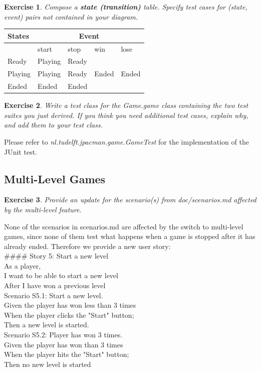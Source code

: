 \documentclass[a4paper]{article}
\newtheorem{thm}{Exercise}
\begin{document}
    \newpage
    \begin{thm}
      Compose a \textbf{state (transition)} table.
      Specify test cases for (state, event) pairs not contained in your diagram.
    \end{thm}
    \begin{table}[h]
      \begin{tabular}{|l|l|l|l|l|}
        \hline
        States  & \multicolumn{4}{|c|}{Event}        \\ \hline
                & start   & stop    & win    & lose  \\ \hline
        Ready   & Playing & Ready   &        &       \\ \hline
        Playing & Playing & Ready   & Ended  & Ended \\ \hline
        Ended   & Ended   & Ended   &        &       \\ \hline
      \end{tabular}
    \end{table}
    
    \begin{thm}
      Write a test class for the \textit{Game.game} class containing the two test suites you just derived.
      If you think you need additional test cases, explain why, and add them to your test class.
    \end{thm}
     Please refer to \textit{nl.tudelft.jpacman.game.GameTest} for the implementation of the JUnit test.
  
  \subsection{Multi-Level Games}
    \begin{thm}
      Provide an update for the scenario(s) from \textit{doc/scenarios.md} affected by the multi-level feature.
    \end{thm}
    None of the scenarios in scenarios.md are affected by the switch to multi-level games,
    since none of them test what happens when a game is stopped after it has already ended.
    Therefore we provide a new user story: \\[.2cm]
    \#\#\#\# Story 5: Start a new level \\[.4cm]
    As a player, \\
     I want to be able to start a new level \\
    After I have won a previous level \\[.4cm]
    Scenario S5.1: Start a new level. \\
    Given the player has won less than 3 times \\
    When  the player clicks the "Start" button; \\
    Then  a new level is started. \\[.4cm]
    Scenario S5.2: Player has won 3 times. \\
    Given the player has won than 3 times \\
    When  the player hits the "Start" button; \\
    Then  no new level is started \\
\end{document}
